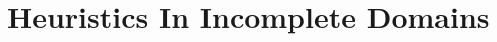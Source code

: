\documentclass{article}
\def\citep#1{\cite{#1}}
\def\und#1{\noindent{\bf #1}:}
\def\und#1{\medskip{\noindent\bf #1:}}
\begin{document}
%
%




\section{Heuristics In Incomplete Domains}
\end{document}
